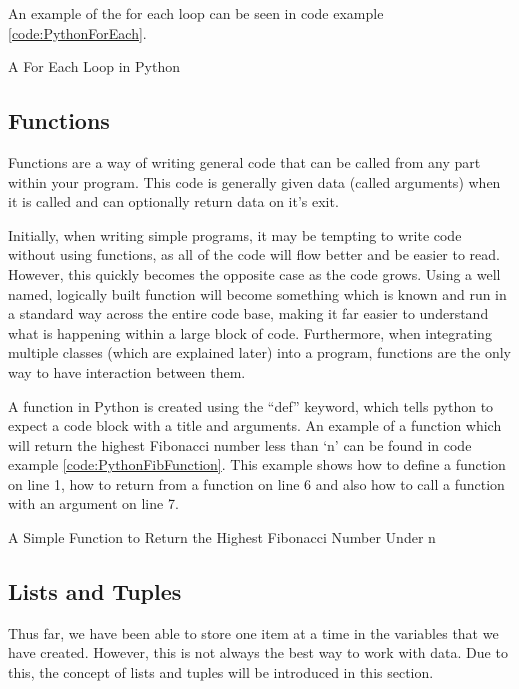 				An example of the for each loop can be seen in code example \ref{code:PythonForEach}.
				\begin{code}
					
					\caption{A For Each Loop in Python}
					\label{code:PythonForEach}
				\end{code}
		\subsection{Functions}
			Functions are a way of writing general code that can be called from any part within your program. 
			This code is generally given data (called arguments) when it is called and can optionally return data on it's exit. 

			Initially, when writing simple programs, it may be tempting to write code without using functions, as all of the code will flow better and be easier to read. 
			However, this quickly becomes the opposite case as the code grows. 
			Using a well named, logically built function will become something which is known and run in a standard way across the entire code base, making it far easier to understand what is happening within a large block of code. 
			Furthermore, when integrating multiple classes (which are explained later) into a program, functions are the only way to have interaction between them. 

			A function in Python is created using the ``def'' keyword, which tells python to expect a code block with a title and arguments. 
			An example of a function which will return the highest Fibonacci number less than `n' can be found in code example \ref{code:PythonFibFunction}.
			This example shows how to define a function on line 1, how to return from a function on line 6 and also how to call a function with an argument on line 7.
			
			\begin{code}
				
				\caption{A Simple Function to Return the Highest Fibonacci Number Under n}
				\label{code:PythonFibFunction}
			\end{code}
		\subsection{Lists and Tuples}
			Thus far, we have been able to store one item at a time in the variables that we have created. 
			However, this is not always the best way to work with data. 
			Due to this, the concept of lists and tuples will be introduced in this section. 
